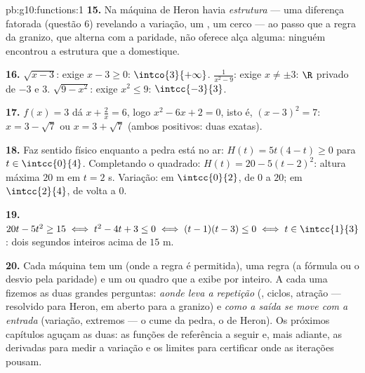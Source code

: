 \begin{solution}{pb:g10:functions:1}
\textbf{15.} Na máquina de Heron havia \emph{estrutura} --- uma
diferença fatorada (questão 6) revelando a variação, um ,
um cerco --- ao passo que a regra da granizo, que alterna com a
paridade, não oferece alça alguma: ninguém encontrou a
estrutura que a domestique.

\textbf{16.} $\sqrt{x - 3}$: exige $x - 3 \geq 0$:
$\intco{3}{+\infty}$. $\frac{1}{x^2 - 9}$: exige
$x \neq \pm 3$: $\R$ privado de $-3$ e $3$.
$\sqrt{9 - x^2}$: exige $x^2 \leq 9$: $\intcc{-3}{3}$.

\textbf{17.} $f(x) = 3$ dá $x + \frac2x = 6$, logo
$x^2 - 6x + 2 = 0$, isto é, $(x - 3)^2 = 7$:
$x = 3 - \sqrt7$ ou $x = 3 + \sqrt7$ (ambos positivos: duas
 exatas).

\textbf{18.} Faz sentido físico enquanto a pedra está no ar:
$H(t) = 5t(4 - t) \geq 0$ para $t \in \intcc{0}{4}$.
Completando o quadrado: $H(t) = 20 - 5(t - 2)^2$: altura máxima
$20$ m em $t = 2$ s. Variação:  em $\intcc{0}{2}$, de
$0$ a $20$;  em $\intcc{2}{4}$, de volta a $0$.

\textbf{19.} $20t - 5t^2 \geq 15 \iff t^2 - 4t + 3 \leq 0 \iff
(t - 1)(t - 3) \leq 0 \iff t \in \intcc{1}{3}$: dois segundos
inteiros acima de $15$ m.

\textbf{20.} Cada máquina tem um  (onde a regra é
permitida), uma regra (a fórmula ou o desvio pela paridade) e um
 ou quadro que a exibe por inteiro. A cada uma fizemos as
duas grandes perguntas: \emph{aonde leva a repetição} (, ciclos, atração --- resolvido para Heron, em aberto para
a granizo) e \emph{como a saída se move com a entrada}
(variação, extremos --- o cume da pedra, o  de Heron). Os
próximos capítulos aguçam as duas: as funções de referência a
seguir e, mais adiante, as derivadas para medir a variação e os
limites para certificar onde as iterações pousam.
\end{solution}
